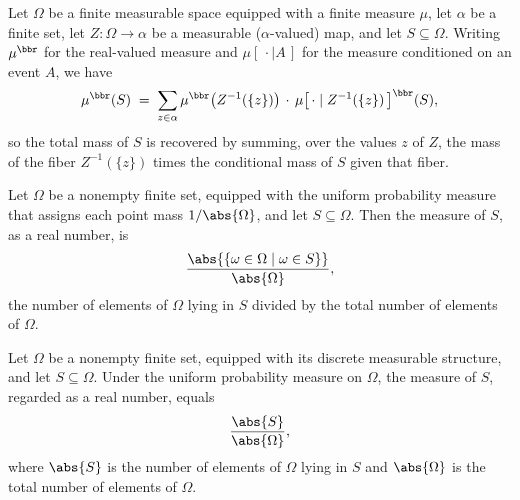 \begin{theorem}
\label{CommunicationComplexity.FiniteMeasureSpace.measureReal_eq_sum_cond_fiber_real}
\leanok
{}
Let $\Omega$ be a finite measurable space equipped with a finite measure $\mu$, let
$\alpha$ be a finite set, let $Z : \Omega \to \alpha$ be a measurable ($\alpha$-valued)
map, and let $S \subseteq \Omega$. Writing $\mu^{\bbr}$ for the real-valued measure and
$\mu[\,\cdot \mid A\,]$ for the measure conditioned on an event $A$, we have
\[
  \mu^{\bbr}(S)
  \;=\; \sum_{z \in \alpha} \mu^{\bbr}\bigl(Z^{-1}(\{z\})\bigr)\,
        \cdot\, \mu\bigl[\,\cdot \mid Z^{-1}(\{z\})\,\bigr]^{\bbr}(S),
\]
so the total mass of $S$ is recovered by summing, over the values $z$ of $Z$, the mass
of the fiber $Z^{-1}(\{z\})$ times the conditional mass of $S$ given that fiber.
\end{theorem}

\begin{theorem}
\label{CommunicationComplexity.uniformOn_univ_measureReal_eq_card_filter}
\leanok
{}
Let $\Omega$ be a nonempty finite set, equipped with the uniform probability measure
that assigns each point mass $1/\abs{\Omega}$, and let $S \subseteq \Omega$. Then the
measure of $S$, as a real number, is
\[
  \frac{\abs{\{\omega \in \Omega \mid \omega \in S\}}}{\abs{\Omega}},
\]
the number of elements of $\Omega$ lying in $S$ divided by the total number of elements
of $\Omega$.
\end{theorem}

\begin{theorem}
\label{CommunicationComplexity.uniformOn_univ_measureReal_eq_card_subtype}
\leanok
{}
Let $\Omega$ be a nonempty finite set, equipped with its discrete measurable structure,
and let $S \subseteq \Omega$. Under the uniform probability measure on $\Omega$, the
measure of $S$, regarded as a real number, equals
\[
\frac{\abs{S}}{\abs{\Omega}},
\]
where $\abs{S}$ is the number of elements of $\Omega$ lying in $S$ and $\abs{\Omega}$ is
the total number of elements of $\Omega$.
\end{theorem}

